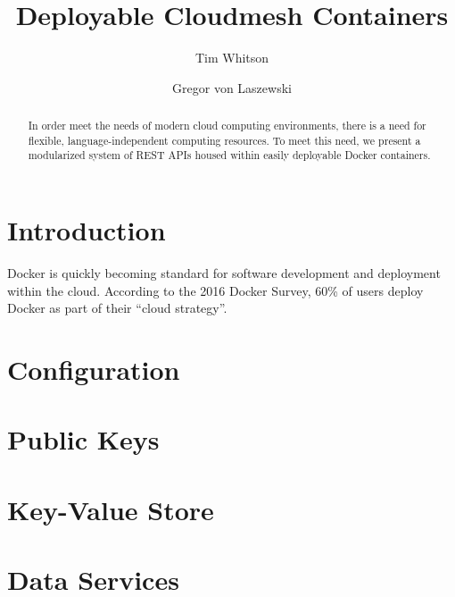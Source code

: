 
\title{Deployable Cloudmesh Containers}

\author{Tim Whitson}

\author{Gregor von Laszewski}

\renewcommand{\shortauthors}{T. Whitson}

\begin{abstract}
In order meet the needs of modern cloud computing environments, there is a need for flexible, language-independent computing resources. To meet this need, we present a modularized system of REST APIs housed within easily deployable Docker containers.
\end{abstract}


\maketitle

\section{Introduction}

Docker is quickly becoming standard for software development and deployment within the cloud. According to the 2016 Docker Survey, 60\% of users deploy Docker as part of their ``cloud strategy''\cite{hid-sp18-526-docker-survey}.

\section{Configuration}

\section{Public Keys}

\section{Key-Value Store}

\section{Data Services}





